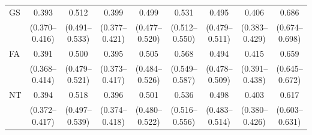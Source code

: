 \documentclass[preprint,12pt,authoryear]{sn-jnl}
\begin{document}
\begin{table}[H]
{\begin{tabular}{lcccccccc}
GS & 0.393 & 0.512 & 0.399 & 0.499 & 0.531 & 0.495 & 0.406 & 0.686 \\
 & (0.370--0.416) & (0.491--0.533) & (0.377--0.421) & (0.477--0.520) & (0.512--0.550) & (0.479--0.511) & (0.383--0.429) & (0.674--0.698) \\
FA & 0.391 & 0.500 & 0.395 & 0.505 & 0.568 & 0.494 & 0.415 & 0.659 \\
 & (0.368--0.414) & (0.479--0.521) & (0.373--0.417) & (0.484--0.526) & (0.549--0.587) & (0.478--0.509) & (0.391--0.438) & (0.645--0.672) \\
NT & 0.394 & 0.518 & 0.396 & 0.501 & 0.536 & 0.498 & 0.403 & 0.617 \\
 & (0.372--0.417) & (0.497--0.539) & (0.374--0.418) & (0.480--0.522) & (0.516--0.556) & (0.483--0.514) & (0.380--0.426) & (0.603--0.631) \\
\bottomrule
\end{tabular}
}
\end{table}
\end{document}
